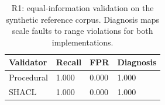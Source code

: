 \begin{table}[t]
\centering\footnotesize
\caption{R1: equal-information validation on the synthetic reference corpus. Diagnosis maps scale faults to range violations for both implementations.}
\label{tab:revision-equal}
\begin{tabular}{@{}llll@{}}
\toprule
Validator & Recall & FPR & Diagnosis \\
\midrule
Procedural & 1.000 & 0.000 & 1.000 \\
SHACL & 1.000 & 0.000 & 1.000 \\
\bottomrule
\end{tabular}
\end{table}
